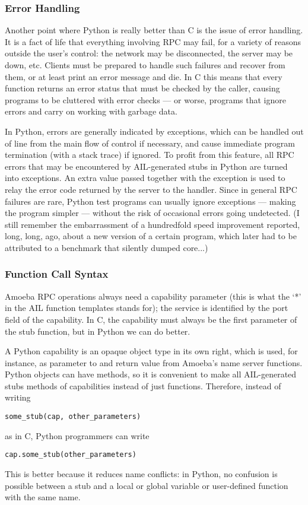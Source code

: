 \subsubsection{Error Handling}

Another point where Python is really better than C is the issue of
error handling.  It is a fact of life that everything involving RPC
may fail, for a variety of reasons outside the user's control: the
network may be disconnected, the server may be down, etc.  Clients
must be prepared to handle such failures and recover from them, or at
least print an error message and die.  In C this means that every
function returns an error status that must be checked by the caller,
causing programs to be cluttered with error checks --- or worse,
programs that ignore errors and carry on working with garbage data.

In Python, errors are generally indicated by exceptions, which can be
handled out of line from the main flow of control if necessary, and
cause immediate program termination (with a stack trace) if ignored.
To profit from this feature, all RPC errors that may be encountered by
AIL-generated stubs in Python are turned into exceptions.  An extra
value passed together with the exception is used to relay the error
code returned by the server to the handler.  Since in general RPC
failures are rare, Python test programs can usually ignore exceptions
--- making the program simpler --- without the risk of occasional
errors going undetected.  (I still remember the embarrassment of a
hundredfold speed improvement reported, long, long, ago, about a new
version of a certain program, which later had to be attributed to a
benchmark that silently dumped core...)

\subsubsection{Function Call Syntax}

Amoeba RPC operations always need a capability parameter (this is what
the `*' in the AIL function templates stands for); the service is
identified by the port field of the capability.  In C, the capability
must always be the first parameter of the stub function, but in Python
we can do better.

A Python capability is an opaque object type in its own right, which
is used, for instance, as parameter to and return value from Amoeba's
name server functions.  Python objects can have methods, so it is
convenient to make all AIL-generated stubs methods of capabilities
instead of just functions.  Therefore, instead of writing
\begin{verbatim}
some_stub(cap, other_parameters)
\end{verbatim}
as in C, Python programmers can write
\begin{verbatim}
cap.some_stub(other_parameters)
\end{verbatim}
This is better because it reduces name conflicts: in Python, no
confusion is possible between a stub and a local or global variable or
user-defined function with the same name.


